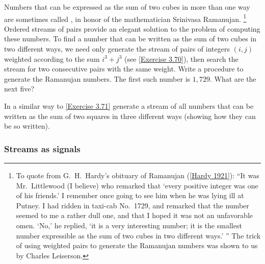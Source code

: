 \begin{exercise}
	\label{Exercise 3.71}
	Numbers that can be expressed as the sum of two cubes in more than one way are sometimes called , in honor of the mathematician Srinivasa Ramanujan.%
	\footnote{
		To quote from G.~H.~Hardy’s obituary of Ramanujan (\cref{Hardy 1921}):
		“It was Mr.~Littlewood (I believe) who remarked that ‘every positive integer was one of his friends.’
		I remember once going to see him when he was lying ill at Putney.
		I had ridden in taxi-cab No.~1729, and remarked that the number seemed to me a rather dull one, and that I hoped it was not an unfavorable omen.
		‘No,’ he replied, ‘it is a very interesting number;
		it is the smallest number expressible as the sum of two cubes in two different ways.’ ”
		The trick of using weighted pairs to generate the Ramanujan numbers was shown to us by Charles Leiserson.
	}
	Ordered streams of pairs provide an elegant solution to the problem of computing these numbers.
	To find a number that can be written as the sum of two cubes in two different ways, we need only generate the stream of pairs of integers \( (i, j) \) weighted according to the sum \( i^3 + j^3 \) (see \cref{Exercise 3.70}), then search the stream for two consecutive pairs with the same weight.
	Write a procedure to generate the Ramanujan numbers.
	The first such number is \( 1,729 \).
	What are the next five?
\end{exercise}



\begin{exercise}
	\label{Exercise 3.72}
	In a similar way to \cref{Exercise 3.71} generate a stream of all numbers that can be written as the sum of two squares in three different ways (showing how they can be so written).
\end{exercise}



\subsubsection*{Streams as signals}

